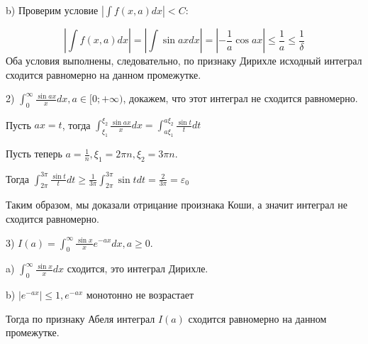 \documentclass[12pt]{article}
\begin{document}
b) Проверим условие $| \int f(x,a) dx | <C$:\par
$$|\int f(x,a) dx | = |\int \sin{ax} dx| = |-\frac{1}{a} \cos{ax}| \leq \frac{1}{a} \leq \frac{1}{\delta}$$
Оба условия выполнены, следовательно, по признаку Дирихле исходный интеграл сходится равномерно на данном промежутке.\par
2) $\int_0^\infty \frac{\sin{ax}}{x} dx, a \in [0; +\infty)$, докажем, что этот интеграл не сходится равномерно.\par
Пусть $ax = t$, тогда $\int_{\xi_1}^{\xi_2} \frac{\sin{ax}}{x} dx = \int_{a\xi_1}^{a\xi_2} \frac{\sin{t}}{t} dt$\par
Пусть теперь $a = \frac{1}{n}, \xi_1 = 2\pi n, \xi_2 = 3 \pi n$. \par
Тогда $\int_{2\pi}^{3\pi} \frac{\sin{t}}{t} dt \geq \frac{1}{3\pi} \int_{2\pi}^{3\pi} \sin{t} dt = \frac{2}{3\pi} = \varepsilon_0$\par
Таким образом, мы доказали отрицание произнака Коши, а значит интеграл не сходится равномерно.\par
3) $I(a) = \int_0^\infty \frac{\sin{x}}{x} e^{-ax} dx, a \geq 0$.\par
a) $\int_0^{\infty} \frac{\sin{x}}{x} dx$ сходится, это интеграл Дирихле.\par
b) $|e^{-ax}| \leq 1, e^{-ax}$ монотонно не возрастает\par
Тогда по признаку Абеля интеграл $I(a)$ сходится равномерно на данном промежутке.\par
\end{document}
